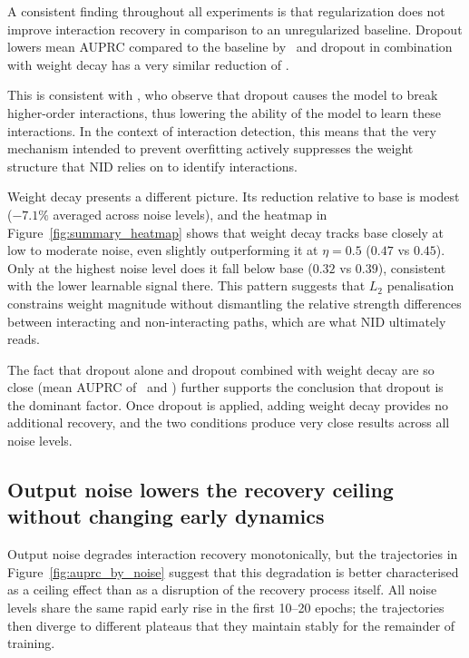 \documentclass{article}
\begin{document}
A consistent finding throughout all experiments is that regularization does not improve interaction recovery in comparison to an unregularized baseline. Dropout lowers mean AUPRC compared to the baseline by \statDropoutDrop\, and dropout in combination with weight decay has a very similar reduction of \statDropoutWDDrop.

This is consistent with \cite{lengerich2021dropoutregularizerinteractioneffects}, who observe that dropout causes the model to break higher-order interactions, thus lowering the ability of the model to learn these interactions. In the context of interaction detection, this means that the very mechanism intended to prevent overfitting actively suppresses the weight structure that NID relies on to identify interactions.

Weight decay presents a different picture. Its reduction relative to base is modest
($-7.1\%$ averaged across noise levels), and the heatmap in
Figure~\ref{fig:summary_heatmap} shows that weight decay tracks base closely at low to
moderate noise, even slightly outperforming it at $\eta = 0.5$ ($0.47$ vs $0.45$). Only at
the highest noise level does it fall below base ($0.32$ vs $0.39$), consistent with the
 lower learnable signal there. This pattern suggests that $L_2$ penalisation
constrains weight magnitude without dismantling the relative strength differences between
interacting and non-interacting paths, which are what NID ultimately reads.

The fact that dropout alone and dropout combined with weight decay are so close (mean AUPRC of \statDropoutMeanAUPRC\ and \statDropoutWDMeanAUPRC{}) further supports the conclusion that dropout is the dominant factor. Once dropout is applied, adding weight decay provides no additional recovery, and the two conditions produce very close results across all noise levels.

\subsection*{Output noise lowers the recovery ceiling without changing early dynamics}

Output noise degrades interaction recovery monotonically, but the trajectories in Figure~\ref{fig:auprc_by_noise} suggest that this degradation is better characterised as a ceiling effect than as a disruption of the recovery process itself. All noise levels share the same rapid early rise in the first 10--20 epochs; the trajectories then diverge to different plateaus that they maintain stably for the remainder of training.
\end{document}
